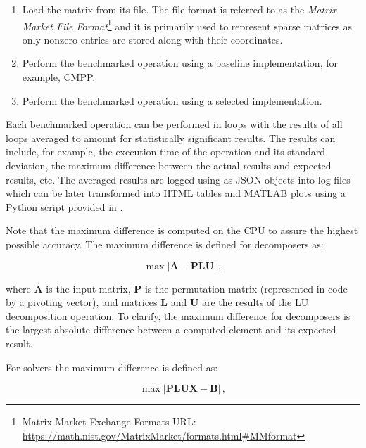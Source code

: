 \begin{enumerate}
	\item Load the matrix from its  file. The  file format is referred to as the \textit{Matrix Market File Format}\footnote{Matrix Market Exchange Formats URL: \url{https://math.nist.gov/MatrixMarket/formats.html\#MMformat}} and it is primarily used to represent sparse matrices as only nonzero entries are stored along with their coordinates.
	\item \label{Item:implementation->decomposition-project->benchmarks->procedure->baseline-operation}
		Perform the benchmarked operation using a baseline implementation, for example, CMPP.
	\item \label{Item:implementation->decomposition-project->benchmarks->procedure->selected-operations}
		Perform the benchmarked operation using a selected implementation.
\end{enumerate}

Each benchmarked operation can be performed in loops with the results of all loops averaged to amount for statistically significant results. The results can include, for example, the execution time of the operation and its standard deviation, the maximum difference between the actual results and expected results, etc. The averaged results are logged using  as JSON objects into log files which can be later transformed into HTML tables and MATLAB plots using a Python script provided in .

Note that the maximum difference is computed on the CPU to assure the highest possible accuracy. The maximum difference is defined for decomposers as:

\begin{equation}
	\max \left| \mathbf{A} - \mathbf{PLU} \right| \,,
	\label{Equation:implementation->decomposition-project->benchmarks->decomposers->maximum-difference}
\end{equation}

where $\mathbf{A}$ is the input matrix, $\mathbf{P}$ is the permutation matrix (represented in code by a pivoting vector), and matrices $\mathbf{L}$ and $\mathbf{U}$ are the results of the LU decomposition operation. To clarify, the maximum difference for decomposers is the largest absolute difference between a computed element and its expected result.

For solvers the maximum difference is defined as:

\begin{equation}
	\max \left| \mathbf{PLUX} - \mathbf{B} \right| \,,
\end{equation}

